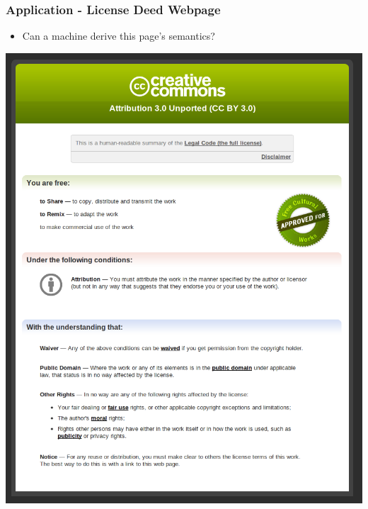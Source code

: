 \documentclass[t, xcolor=dvipsnames, 10pt]{beamer}
\begin{document}
\begin{frame}[t]
\frametitle{Application - License Deed Webpage}
        \begin{itemize}
            \item Can a machine derive this page's semantics?
        \end{itemize}
        \begin{center}
            \includegraphics[height=0.8\textheight]{resources/cc/cc-deed-rendered-in-browser.png}
        \end{center}
\end{frame}
\end{document}
